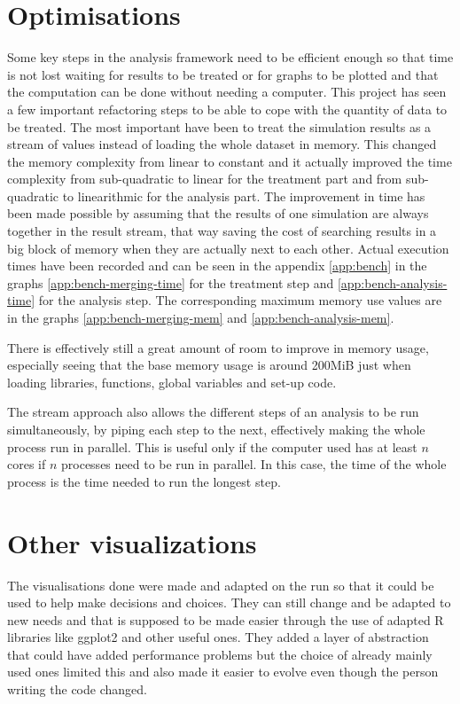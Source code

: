 \documentclass[a4paper,12pt]{report}
\begin{document}
\section{Optimisations}
Some key steps in the analysis framework need to be efficient enough so that time is not lost waiting for results to be treated or for graphs to be plotted and that the computation can be done without needing a computer.
This project has seen a few important refactoring steps to be able to cope with the quantity of data to be treated. The most important have been to treat the simulation results as a stream of values instead of loading the whole dataset in memory. This changed the memory complexity from linear to constant and it actually improved the time complexity from sub-quadratic to linear for the treatment part and from sub-quadratic to linearithmic for the analysis part. The improvement in time has been made possible by assuming that the results of one simulation are always together in the result stream, that way saving the cost of searching results in a big block of memory when they are actually next to each other.
Actual execution times have been recorded and can be seen in the appendix \ref{app:bench} in the graphs \ref{app:bench-merging-time} for the treatment step and \ref{app:bench-analysis-time} for the analysis step. The corresponding maximum memory use values are in the graphs \ref{app:bench-merging-mem} and \ref{app:bench-analysis-mem}.

There is effectively still a great amount of room to improve in memory usage, especially seeing that the base memory usage is around 200MiB just when loading libraries, functions, global variables and set-up code.

The stream approach also allows the different steps of an analysis to be run simultaneously, by piping each step to the next, effectively making the whole process run in parallel. This is useful only if the computer used has at least $n$ cores if $n$ processes need to be run in parallel. In this case, the time of the whole process is the time needed to run the longest step.

\section{Other visualizations}
The visualisations done were made and adapted on the run so that it could be used to help make decisions and choices. They can still change and be adapted to new needs and that is supposed to be made easier through the use of adapted R libraries like ggplot2 and other useful ones. They added a layer of abstraction that could have added performance problems but the choice of already mainly used ones limited this and also made it easier to evolve even though the person writing the code changed.
\end{document}
